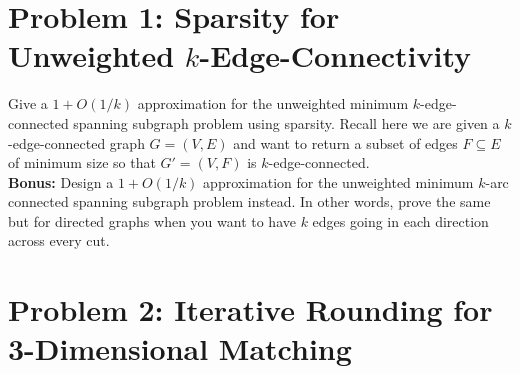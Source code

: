 

\renewcommand{\P}[1]{{\mathbb{P}}\left[#1\right]}
\renewcommand{\PP}[2]{{\mathbb{P}}_{#1}\left[#2\right]}
\renewcommand{\E}[1]{{\mathbb{E}}\left[#1\right]}
\renewcommand{\EE}[2]{{\mathbb{E}}_{#1}\left[#2\right]}
\renewcommand{\R}{\ensuremath{\mathbb R}}
\renewcommand{\Z}{\ensuremath{\mathbb Z}}
\def\cI{{\cal I}}



\noindent
   \begin{center}
   \end{center}

\pagestyle{empty}

\vspace*{3mm}
\noindent {\large \textcolor{purple}{Collect at least 3 points from the following 4 problems, or do more for extra credit. Normal problems are worth 1 point. The bonus versions are worth two points. (Do not do both for any problem.)}}

\vspace*{-3mm}
\section{Problem 1: Sparsity for Unweighted $k$-Edge-Connectivity}

Give a $1+O(1/k)$ approximation for the unweighted minimum $k$-edge-connected spanning subgraph problem using sparsity. Recall here we are given a $k$-edge-connected graph $G=(V,E)$ and want to return a subset of edges $F \subseteq E$ of minimum size so that $G'=(V,F)$ is $k$-edge-connected.\\

\noindent \textbf{Bonus:} Design a $1+O(1/k)$ approximation for the unweighted minimum $k$-arc connected spanning subgraph problem instead. In other words, prove the same but for directed graphs when you want to have $k$ edges going in each direction across every cut. 

\section{Problem 2: Iterative Rounding for 3-Dimensional Matching}

